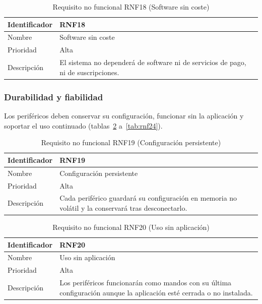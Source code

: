 \begin{table}[H]
	\centering
	\renewcommand{\arraystretch}{2}
	\begin{tabular}{|l|p{10cm}|}
		\hline
		Identificador & RNF18 \\
		\hline
		Nombre & Software sin coste \\
		\hline
		Prioridad & Alta \\
		\hline
		Descripción & El sistema no dependerá de software ni de servicios de pago, ni de suscripciones. \\
		\hline
	\end{tabular}
	\caption{Requisito no funcional RNF18 (Software sin coste)}
	\label{tab:rnf18}
\end{table}

\subsubsection{Durabilidad y fiabilidad}

Los periféricos deben conservar su configuración, funcionar sin la aplicación y soportar el uso continuado (tablas~\ref{tab:rnf19} a~\ref{tab:rnf24}).

\begin{table}[H]
	\centering
	\renewcommand{\arraystretch}{2}
	\begin{tabular}{|l|p{10cm}|}
		\hline
		Identificador & RNF19 \\
		\hline
		Nombre & Configuración persistente \\
		\hline
		Prioridad & Alta \\
		\hline
		Descripción & Cada periférico guardará su configuración en memoria no volátil y la conservará tras desconectarlo. \\
		\hline
	\end{tabular}
	\caption{Requisito no funcional RNF19 (Configuración persistente)}
	\label{tab:rnf19}
\end{table}

\begin{table}[H]
	\centering
	\renewcommand{\arraystretch}{2}
	\begin{tabular}{|l|p{10cm}|}
		\hline
		Identificador & RNF20 \\
		\hline
		Nombre & Uso sin aplicación \\
		\hline
		Prioridad & Alta \\
		\hline
		Descripción & Los periféricos funcionarán como mandos con su última configuración aunque la aplicación esté cerrada o no instalada. \\
		\hline
	\end{tabular}
	\caption{Requisito no funcional RNF20 (Uso sin aplicación)}
	\label{tab:rnf20}
\end{table}

